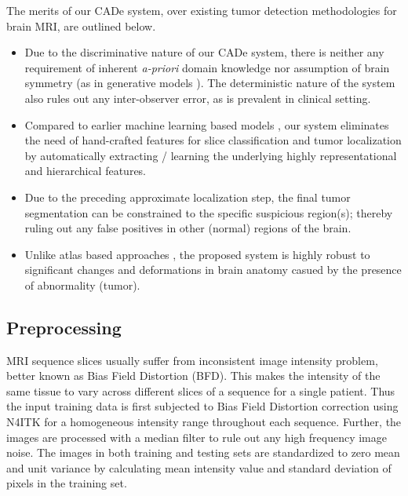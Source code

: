 \documentclass[journal,twocolumn]{IEEEtran}
\begin{document}
The merits of our  CADe system,  over existing  tumor detection methodologies for brain MRI, are outlined below.

\begin{itemize}
	\item Due to the discriminative nature of our  CADe system, there is neither any requirement of inherent \emph{a-priori} domain knowledge nor assumption of brain symmetry (as in generative models \cite{Prastawa2004_gen, Cuadra2004_atlas, Zacharaki2008_gen, Menze2010_gen}). The deterministic nature of the system also rules out any inter-observer error, as  is prevalent in clinical setting.
	
	\item Compared to earlier machine learning based models \cite{Zikic2012decision, Islam2013multifractal, Subbanna2013, Wu2014_des,Soltaninejad2016}, our system eliminates the need of  hand-crafted features for slice classification and tumor localization by automatically extracting / learning the underlying highly representational and hierarchical features.
	
	\item Due to the preceding approximate localization step, the final tumor segmentation can be constrained to the specific suspicious region(s); thereby ruling out any false positives in other (normal) regions of the brain.
	
	\item Unlike   atlas based approaches \cite{Khotanlou2009_3d}, the proposed system is highly robust to significant changes and deformations in brain anatomy casued by the  presence of abnormality (tumor).
	
\end{itemize}


\subsection{Preprocessing}
MRI sequence slices usually suffer from inconsistent image intensity problem, better known as Bias Field Distortion (BFD). This makes the intensity of the same tissue to vary across different slices of a sequence for a single patient. Thus the input training data is first subjected to Bias Field Distortion correction using N4ITK \cite{Tustison2010_n4itk}  for a homogeneous intensity range throughout each sequence. Further, the images are processed with a median filter to rule out any high frequency image noise. The images in both training and testing sets are standardized to zero mean and unit variance by calculating mean intensity value and standard deviation of pixels in the training set.
\end{document}
